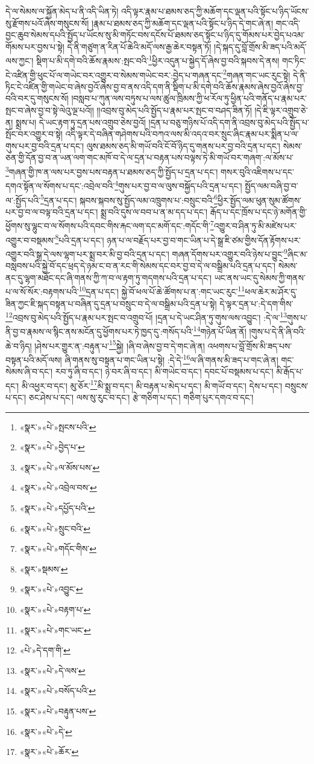 དེ་ལ་སེམས་ལ་སྐྱོན་མེད་པ་ནི་འདི་ཡིན་ཏེ། འདི་ལྟར་རྣམ་པ་ཐམས་ཅད་ཀྱི་མཆོག་དང་ལྡན་པའི་སྟོང་པ་ཉིད་ཡོངས་སུ་རྫོགས་པའོ་ཞེས་གསུངས་སོ། །རྣམ་པ་ཐམས་ཅད་ཀྱི་མཆོག་དང་ལྡན་པའི་སྟོང་པ་ཉིད་དེ་གང་ཞེ་ན། གང་འདི་བྱང་ཆུབ་སེམས་དཔའི་སྤྱོད་པ་ཡོངས་སུ་མི་གཏོང་བས་དངོས་པོ་ཐམས་ཅད་སྟོང་པ་ཉིད་དུ་གོམས་པར་བྱེད་པའམ་གོམས་པར་བྱས་པ་སྟེ། དེ་ནི་གཙུག་ན་རིན་པོ་ཆེའི་མདོ་ལས་རྒྱ་ཆེར་བསྟན་ཏོ། །དེ་སྐད་དུ་བློ་གྲོས་མི་ཟད་པའི་མདོ་ལས་ཀྱང་། སྡིག་པ་མི་དགེ་བའི་ཆོས་རྣམས་:སྤང་བའི་\footnote{«སྣར་»«པེ་»སྤངས་པའི་}ཕྱིར་འདུན་པ་སྐྱེད་དོ་ཞེས་བྱ་བའི་སྐབས་དེ་ནས། གང་ཏིང་ངེ་འཛིན་གྱི་ཕུང་པོ་ལ་གཡེང་བར་འགྱུར་བ་སེམས་གཡེང་བར་:བྱེད་པ་གཞན་དང་\footnote{«སྣར་»«པེ་»བྱེད་པ་}གཞན་གང་ཡང་རུང་སྟེ། དེ་ནི་ཏིང་ངེ་འཛིན་གྱི་གཡེང་བ་ཞེས་བྱའོ་ཞེས་བྱ་བ་ནས་འདི་དག་ནི་སྡིག་པ་མི་དགེ་བའི་ཆོས་རྣམས་ཞེས་བྱའོ་ཞེས་བྱ་བའི་བར་དུ་གསུངས་སོ། །བསླབ་པ་ཀུན་ལས་བཏུས་པ་ལས་ཚུལ་ཁྲིམས་ཀྱི་ཕ་རོལ་ཏུ་ཕྱིན་པའི་གནོད་པ་རྣམ་པར་སྤང་བ་ཞེས་བྱ་བ་སྟེ་ལེའུ་ལྔ་པའོ།། །།འབྲས་བུ་མེད་པའི་སྤྱོད་པ་རྣམ་པར་སྤང་བ་བཤད་ཟིན་ཏོ། །དེ་ཇི་ལྟར་འགྲུབ་ཅེ་ན། སྨྲས་པ། དེ་ཡང་རྟག་ཏུ་དྲན་པས་འགྲུབ་ཅེས་བྱའོ། །དྲན་པ་བཅུ་གཉིས་པོ་འདི་དག་ནི་འབྲས་བུ་མེད་པའི་སྤྱོད་པ་སྤོང་བར་འགྱུར་བ་སྟེ། འདི་ལྟར་དེ་བཞིན་གཤེགས་པའི་བཀའ་ལས་མི་འདའ་བར་སྲུང་ཞིང་རྣམ་པར་སྨིན་པ་ལ་གུས་པར་བྱ་བའི་དྲན་པ་དང་། ལུས་ཐམས་ཅད་མི་གཡོ་བའི་ངོ་བོ་ཉིད་དུ་གནས་པར་བྱ་བའི་དྲན་པ་དང་། སེམས་ཅན་གྱི་དོན་བྱ་བ་ན་ཡན་ལག་གང་མཁོ་བ་དེ་ལ་དྲན་པ་བརྟན་པས་བལྟས་ཏེ་མི་གཡོ་བར་གཞག་:ལ་མོས་པ་\footnote{«སྣར་»«པེ་»ལ་མོས་པས་}གཞན་གྱི་ཁ་ན་ལས་པར་བྱས་པས་བརྟན་པ་ཐམས་ཅད་ཀྱི་སྤྱོད་པ་དྲན་པ་དང་། གསར་བུའི་འཇིགས་པ་དང་དགའ་སྟོན་ལ་སོགས་པ་དང་:འབྲེལ་བའི་\footnote{«སྣར་»«པེ་»འབྲེལ་བས་}གུས་པར་བྱ་བ་ལ་ལུས་བསྐྱོད་པའི་དྲན་པ་དང་། སྤྱོད་ལམ་བཞི་བྱ་བ་ལ་:སྤྱོད་པའི་\footnote{«སྣར་»«པེ་»དཔྱོད་པའི་}དྲན་པ་དང་། སྐབས་སྐབས་སུ་སྤྱོད་ལམ་འཁྲུགས་པ་:བསྲུང་བའི་\footnote{«སྣར་»«པེ་»སྲུང་བའི་}ཕྱིར་སྤྱོད་ལམ་ཕུན་སུམ་ཚོགས་པར་བྱ་བ་ལ་བལྟ་བའི་དྲན་པ་དང་། སྨྲ་བའི་དུས་ལ་བབ་པ་ན་མ་དད་པ་དང་། རྒོད་པ་དང་ཁྲོས་པ་དང་ཉེ་མགོན་གྱི་ཕྱོགས་སུ་ལྷུང་བ་ལ་སོགས་པའི་དབང་གིས་རྐང་ལག་དང་མགོ་དང་:གདོང་གི་\footnote{«སྣར་»«པེ་»གདོང་གིས་}འགྱུར་བ་ཤིན་ཏུ་མི་མཛེས་པར་འགྱུར་བ་བསྡམས་\footnote{«སྣར་»སྡམས་}པའི་དྲན་པ་དང་། ཉན་པ་ལ་བརྗོད་པར་བྱ་བ་གང་ཡིན་པ་དེ་སྒྲ་ཇི་ཙམ་གྱིས་དོན་རྟོགས་པར་འགྱུར་བའི་སྒྲ་དེ་ལས་ལྷག་པར་སྨྲ་བར་མི་བྱ་བའི་དྲན་པ་དང་། གཞན་དོགས་པར་འགྱུར་བའི་ཉེས་པ་བྱུང་\footnote{«སྣར་»«པེ་»འབྱུང་}ཞིང་མ་བསླབས་པའི་སྐྱེ་བོ་དང་ཕྲད་དེ་ཉམ་ང་བ་ན་རང་གི་སེམས་དང་བར་བྱ་བ་དེ་ལ་བསྒྲིམ་པའི་དྲན་པ་དང་། སེམས་ནང་དུ་ལྷག་མཐོང་དང་ཞི་གནས་ཀྱི་ཀ་བ་ལ་རྟག་ཏུ་གདགས་པའི་དྲན་པ་དང་། ཡང་ནས་ཡང་དུ་སེམས་ཀྱི་གནས་པ་ལ་སོ་སོར་:བརྟགས་པའི་\footnote{«སྣར་»«པེ་»བརྟག་པ་}དྲན་པ་དང་། སྐྱེ་བོ་ཕལ་པོ་ཆེ་ཚོགས་པ་ན་:གང་ཡང་རུང་\footnote{«སྣར་»«པེ་»གང་ཡང་}ཕལ་ཆེར་མ་ཤོར་དུ་ཟིན་ཀྱང་ཇི་སྐད་བསྟན་པ་བཞིན་དུ་དྲན་པ་བསྲུང་བ་དེ་ལ་བསྒྲིམ་པའི་དྲན་པ་སྟེ། དེ་ལྟར་དྲན་པ་:དེ་དག་གིས་\footnote{«པེ་»དེ་དག་གི་}འབྲས་བུ་མེད་པའི་སྤྱོད་པ་རྣམ་པར་སྤང་བ་འགྲུབ་པོ། །དྲན་པ་དེ་ཡང་ཤིན་ཏུ་གུས་ལས་འབྱུང་། :དེ་ལ་\footnote{«སྣར་»«པེ་»དེ་ལས་}གུས་པ་ནི་བྱ་བ་རྣམས་ལ་སྙིང་ནས་མངོན་དུ་ཕྱོགས་པར་ཏེ་ཁྱད་དུ་:གསོད་པའི་\footnote{«སྣར་»«པེ་»བསོད་པའི་}གཉེན་པོ་ཡིན་ནོ། །གུས་པ་དེ་ནི་ཞི་བའི་ཆེ་བ་ཉིད། །ཤེས་པར་གྱུར་ན་:བརྟུན་པ་\footnote{«སྣར་»«པེ་»བརྟུན་པས་}སྐྱེ། །ཞི་བ་ཞེས་བྱ་བ་དེ་གང་ཞེ་ན། འཕགས་པ་བློ་གྲོས་མི་ཟད་པས་བསྟན་པའི་མདོ་ལས། ཞི་གནས་སུ་བསྟན་པ་གང་ཡིན་པ་སྟེ། :དེ་དེ་\footnote{«སྣར་»«པེ་»དེ་}ལ་ཞི་གནས་མི་ཟད་པ་གང་ཞེ་ན། གང་སེམས་ཞི་བ་དང་། རབ་ཏུ་ཞི་བ་དང་། ཉེ་བར་ཞི་བ་དང་། མི་གཡེང་བ་དང་། དབང་པོ་བསྡམས་པ་དང་། མི་རྒོད་པ་དང་། མི་འཕྱར་བ་དང་། མུ་ཅོར་\footnote{«སྣར་»«པེ་»ཆོར་}མི་སྨྲ་བ་དང་། མི་བརྟན་པ་མེད་པ་དང་། མི་གཡོ་བ་དང་། དེས་པ་དང་། བསྲུངས་པ་དང་། ཅང་ཤེས་པ་དང་། ལས་སུ་རུང་བ་དང་། རྩེ་གཅིག་པ་དང་། གཅིག་པུར་དགའ་བ་དང་། 